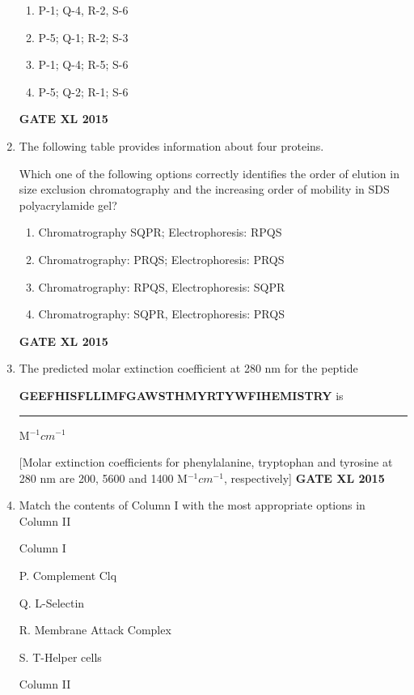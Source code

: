 \documentclass[journal,12pt,onecolumn]{IEEEtran}
\begin{document}
\begin{enumerate}
\begin{minipage}{0.5\textwidth}
\begin{flushleft}
		\end{flushleft}
	\end{minipage}
    \begin{enumerate}
            \item P-1; Q-4, R-2, S-6
	    \item P-5; Q-1; R-2; S-3
	    \item P-1; Q-4; R-5; S-6
            \item P-5; Q-2; R-1; S-6
	\end{enumerate}
\hfill{\textbf{GATE XL 2015}}
\item The following table provides information about four proteins.
\vspace{0.2cm}
\begin{table}[H]

\end{table}
Which one of the following options correctly identifies the order of elution in size exclusion chromatography and the increasing order of mobility in SDS polyacrylamide gel?
    \begin{enumerate}
	    \item Chromatrography SQPR; Electrophoresis: RPQS
	    \item Chromatrography: PRQS; Electrophoresis: PRQS
	    \item Chromatrography: RPQS, Electrophoresis: SQPR
            \item Chromatrography: SQPR, Electrophoresis: PRQS
    \end{enumerate}
\hfill{\textbf{GATE XL 2015}}
\item The predicted molar extinction coefficient at 280 nm for the peptide

	\textbf{GEEFHISFLLIMFGAWSTHMYRTYWFIHEMISTRY} is\rule{1cm}{0.15mm} M$^{-1}cm^{-1}$

[Molar extinction coefficients for phenylalanine, tryptophan and tyrosine at 280 nm are 200, 5600 and 1400 M$^{-1}cm^{-1}$, respectively]
\hfill{\textbf{GATE XL 2015}}
\item Match the contents of Column I with the most appropriate options in Column II
	

	\begin{minipage}{0.5\textwidth}
		\begin{flushleft}
Column I

P. Complement Clq

Q. L-Selectin

R. Membrane Attack Complex

S. T-Helper cells
		\end{flushleft}
	\end{minipage}
	\begin{minipage}{0.5\textwidth}
		\begin{flushleft}
Column II


\end{flushleft}
\end{minipage}
\end{enumerate}
\end{document}
